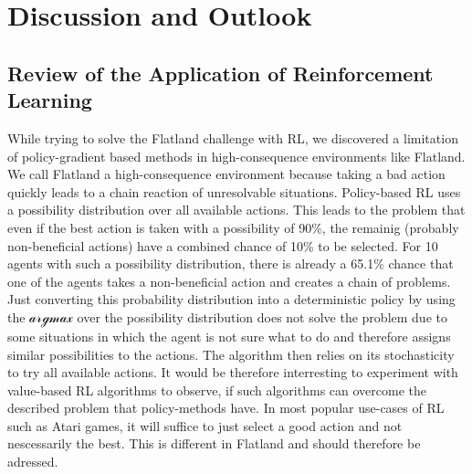 %
%

\chapter{Discussion and Outlook}
\label{chap.diskussion}
\section{Review of the Application of Reinforcement Learning}\label{discussion_rl}
While trying to solve the Flatland challenge with RL, we discovered a limitation of policy-gradient based methods in high-consequence environments like Flatland. 
We call Flatland a high-consequence environment because taking a bad action quickly leads to a chain reaction of unresolvable situations. Policy-based RL uses a possibility distribution over all available actions. This leads to the problem that even if the best action is taken with a possibility of 90\%, the remainig (probably non-beneficial actions) have a combined chance of 10\% to be selected. For 10 agents with such a possibility distribution, there is already a 65.1\% chance that one of the agents takes a non-beneficial action and creates a chain of problems. Just converting this probability distribution into a deterministic policy by using the $\mathcal{argmax}$ over the possibility distribution does not solve the problem due to some situations in which the agent is not sure what to do and therefore assigns similar possibilities to the actions. The algorithm then relies on its stochasticity to try all available actions. It would be therefore interresting to experiment with value-based RL algorithms to observe, if such algorithms can overcome the described problem that policy-methods have. In most popular use-cases of RL such as Atari games, it will suffice to just select a good action and not nescessarily the best. This is different in Flatland and should therefore be adressed.

